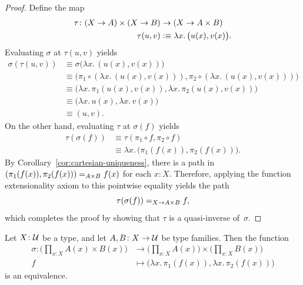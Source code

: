 \begin{proof}
    Define the map
    \begin{align*}
        \tau\colon(X\to A)\times(X\to B)&\to(X\to A\times B)\\
        \tau(u,v)&\defeq\lambda x.\,\bigl(u(x),v(x)\bigr).
    \end{align*}
    Evaluating $\sigma$ at $\tau(u,v)$ yields
    \begin{align*}
        \sigma(\tau(u,v))
            &\equiv\sigma\bigl(\lambda x.\,(u(x),v(x))\bigr)\\
            &\equiv\bigl(\pi_1\circ(\lambda x.\,(u(x),v(x))),\pi_2\circ(\lambda x.\,(u(x),v(x)))\bigr)\\
            &\equiv\bigl(\lambda x.\,\pi_1(u(x),v(x)),\lambda x.\,\pi_2(u(x),v(x))\bigr)\\
            &\equiv\bigl(\lambda x.\,u(x),\lambda x.\,v(x)\bigr)\\
            &\equiv(u,v).
    \end{align*}
    On the other hand, evaluating $\tau$ at $\sigma(f)$ yields
    \begin{align*}
        \tau(\sigma(f))
            &\equiv\tau(\pi_1\circ f,\pi_2\circ f)\\
            &\equiv\lambda x.\,\bigl(\pi_1(f(x)),\pi_2(f(x))\bigr).
    \end{align*}
    By Corollary~\ref{cor:cartesian-uniqueness}, there is a path in $(\pi_1(f(x)),\pi_2(f(x)))\mathrel{=_{A\times B}}f(x)$ for each $x\colon X$. Therefore, applying the function extensionality axiom to this pointwise equality yields the path
    \[
        \tau(\sigma(f))\mathrel{=_{X\to A\times B}}f,
    \]
    which completes the proof by showing that $\tau$ is a quasi-inverse of~$\sigma$.
\end{proof}

\begin{thm}\fe
    Let\/ $X\colon\univ$ be a type, and let\/ $A,B\colon X\to\univ$ be type families. Then the function
    \begin{align*}
        \sigma\colon
                \biggl(
                    \prod_{x\colon X}A(x)\times B(x)
                \biggr)
            &\to
                \biggl(
                    \prod_{x\colon X}
                        A(x)\biggr)\times\biggl(\prod_{x\colon X}B(x)
                \biggr)\\
        f&\mapsto
            \bigl(
                \lambda x.\,\pi_1(f(x)),\lambda x.\,\pi_2(f(x))
            \bigr)
    \end{align*}
    is an equivalence.
\end{thm}

